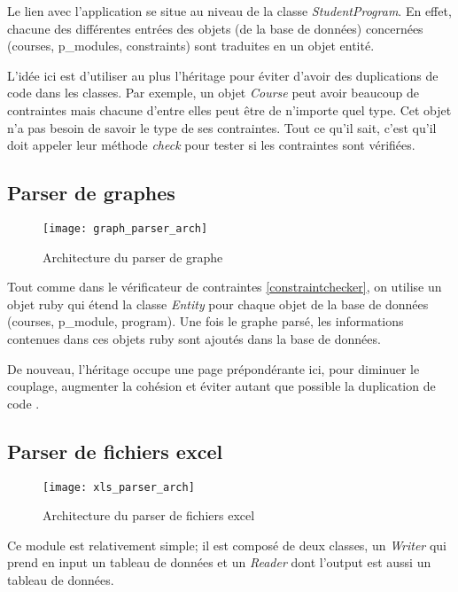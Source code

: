 Le lien avec l'application se situe au niveau de la classe \textit{StudentProgram}. En effet, chacune des différentes entrées des objets (de la base de données) concernées (courses, p\_modules, constraints) sont traduites en un objet entité.

L'idée ici est d'utiliser au plus l'héritage pour éviter d'avoir des duplications de code dans les classes. Par exemple, un objet \textit{Course} peut avoir beaucoup de contraintes mais chacune d’entre elles peut être de n'importe quel type. Cet objet n'a pas besoin de savoir le type de ses contraintes. Tout ce qu'il sait, c'est qu'il doit appeler leur méthode \textit{check} pour tester si les contraintes sont vérifiées. 


\subsection{Parser de graphes}

\begin{figure}[H]
\centering
\caption{Architecture du parser de graphe}
\label{fig:graph_parser_arch}
\texttt{[image: graph\_parser\_arch]}
\end{figure}



Tout comme dans le vérificateur de contraintes \ref{constraintchecker}, on utilise un objet ruby qui étend la classe \textit{Entity} pour chaque objet de la base de données (courses, p\_module, program). Une fois le graphe parsé, les informations contenues dans ces objets ruby sont ajoutés dans la base de données. 

De nouveau, l'héritage occupe une page prépondérante ici, pour diminuer le couplage, augmenter la cohésion  et éviter autant que possible la duplication de code \cite{cohesion_couplage}. 

\subsection{Parser de fichiers excel}
\label{xls_parser}
\begin{figure}[H]
\centering
\caption{Architecture du parser de fichiers excel}
\label{xls_parser_arch}
\texttt{[image: xls\_parser\_arch]}
\end{figure}

Ce module est relativement simple; il est composé de deux classes, un \textit{Writer} qui prend en input un tableau de données et un \textit{Reader} dont l'output est aussi un tableau de données.


